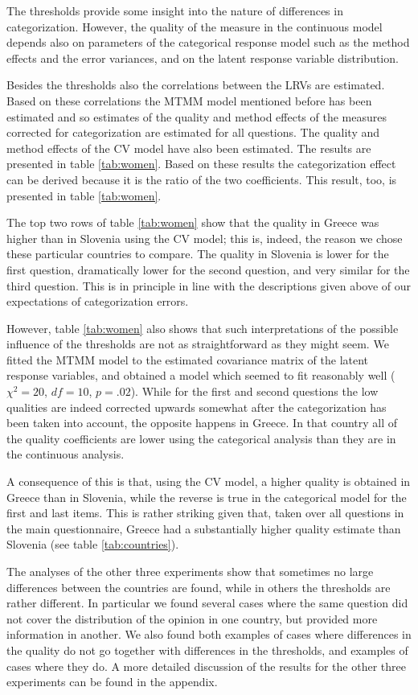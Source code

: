 \documentclass[a4paper,12pt]{article}
\begin{document}
The thresholds provide some insight into the nature of differences in categorization. However, the quality of the measure in the continuous model depends also on parameters of the categorical response model such as the method effects and the error variances, and on the latent response variable distribution. 


Besides the thresholds also the correlations between the LRVs are estimated. Based on these correlations the MTMM model mentioned before has been estimated and so estimates of the quality and method effects of the measures corrected for categorization are estimated for all questions. The quality and method effects of the CV model have also been estimated. The results are presented in table \ref{tab:women}. Based on these results the categorization effect can be derived because it is the ratio of the two coefficients. This result, too, is presented in table \ref{tab:women}.

The top two rows of table \ref{tab:women} show that the quality in Greece was higher than in Slovenia using the CV model; this is, indeed, the reason we chose these particular countries to compare. The quality in Slovenia is lower for the first question, dramatically lower for the second question, and very similar for the third question. This is in principle in line with the descriptions given above of our expectations of categorization errors.

However, table \ref{tab:women} also shows that such interpretations of the possible influence of the thresholds are not as straightforward as they might seem. We fitted the MTMM model to the estimated covariance matrix of the latent response variables, and obtained a model which seemed to fit reasonably well ($\chi^2 = 20$, $df=10$, $p=.02$). While for the first and second questions the low qualities are indeed corrected upwards somewhat after the categorization has been taken into account, the opposite happens in Greece. In that country all of the quality coefficients are lower using the categorical analysis than they are in the continuous analysis.  

A consequence of this is that, using the CV model, a higher quality is obtained in Greece than in Slovenia, while the reverse is true in the categorical model for the first and last items. This is rather striking given that, taken over all questions in the main questionnaire, Greece had a substantially higher quality estimate than Slovenia (see table \ref{tab:countries}).

The analyses of the other three experiments show that sometimes no large differences between the countries are found, while in others the thresholds are rather different. In particular we found several cases where the same question did not cover the distribution of the opinion in one country, but provided more information in another. We also found both examples of cases where differences in the quality do not go together with differences in the thresholds, and examples of cases where they do. A more detailed discussion of the results for the other three experiments can be found in the appendix.
\end{document}
